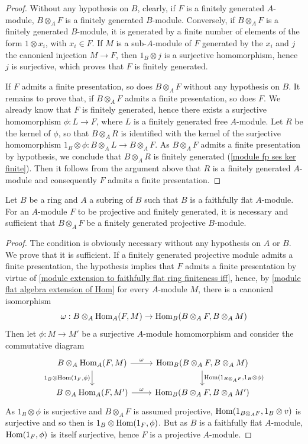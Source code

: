 \begin{proof}
Without any hypothesis on $B$, clearly, if $F$ is a finitely generated $A$-module, $B\otimes_AF$ is a finitely generated $B$-module. Conversely, if $B\otimes_AF$ is a finitely generated $B$-module, it is generated by a finite number of elements of the form $1\otimes x_i$, with $x_i\in F$. If $M$ is a sub-$A$-module of $F$ generated by the $x_i$ and $j$ the canonical injection $M\to F$, then $1_B\otimes j$ is a surjective homomorphism, hence $j$ is surjective, which proves that $F$ is finitely generated.\par
If $F$ admits a finite presentation, so does $B\otimes_AF$ without any hypothesis on $B$. It remains to prove that, if $B\otimes_AF$ admits a finite presentation, so does $F$. We already know that $F$ is finitely generated, hence there exists a surjective homomorphism $\phi:L\to F$, where $L$ is a finitely generated free $A$-module. Let $R$ be the kernel of $\phi$, so that $B\otimes_AR$ is identified with the kernel of the surjective homomorphism $1_B\otimes\phi:B\otimes_AL\to B\otimes_AF$. As $B\otimes_AF$ admits a finite presentation by hypothesis, we conclude that $B\otimes_AR$ is finitely generated (\cref{module fp ses ker finite}). Then it follows from the argument above that $R$ is a finitely generated $A$-module and consequently $F$ admits a finite presentation.
\end{proof}
\begin{proposition}\label{module extension to faithfully flat finite projective iff}
Let $B$ be a ring and $A$ a subring of $B$ such that $B$ is a faithfully flat $A$-module. For an $A$-module $F$ to be projective and finitely generated, it is necessary and sufficient that $B\otimes_AF$ be a finitely generated projective $B$-module.
\end{proposition}
\begin{proof}
The condition is obviously necessary without any hypothesis on $A$ or $B$. We prove that it is sufficient. If a finitely generated projective module admits a finite presentation, the hypothesis implies that $F$ admits a finite presentation by virtue of \cref{module extension to faithfully flat ring finiteness iff}, hence, by \cref{module flat algebra extension of Hom} for every $A$-module $M$, there is a canonical isomorphism
\[\omega:B\otimes_A\mathrm{Hom}_A(F,M)\to \mathrm{Hom}_B(B\otimes_AF,B\otimes_AM)\]
Then let $\phi:M\to M'$ be a surjective $A$-module homomorphism and consider the commutative diagram
\[\begin{tikzcd}
B\otimes_A\Hom_A(F,M)\ar[r,"\omega"]\ar[d,swap,"{1_B\otimes\Hom(1_F,\phi)}"]&\Hom_B(B\otimes_AF,B\otimes_AM)\ar[d,"{\Hom(1_{B\otimes_AF},1_B\otimes\phi)}"]\\
B\otimes_A\Hom_A(F,M')\ar[r,"\omega"]&\Hom_B(B\otimes_AF,B\otimes_AM')
\end{tikzcd}\]
As $1_B\otimes\phi$ is surjective and $B\otimes_AF$ is assumed projective, $\mathrm{Hom}(1_{B\otimes_AF},1_B\otimes v)$ is surjective and so then is $1_B\otimes\mathrm{Hom}(1_F,\phi)$. But as $B$ is a faithfully flat $A$-module, $\mathrm{Hom}(1_F,\phi)$ is itself surjective, hence $F$ is a projective $A$-module.
\end{proof}
